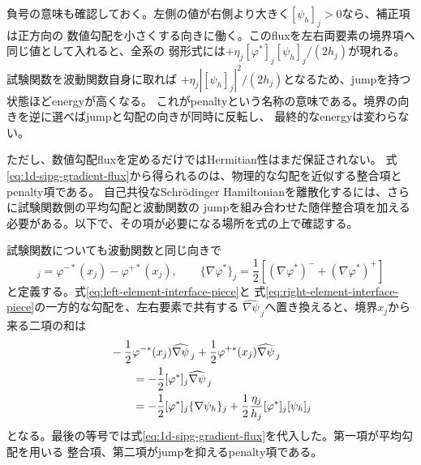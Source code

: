 \documentclass[11pt,a4paper]{article}
\begin{document}
負号の意味も確認しておく。左側の値が右側より大きく$[\psi_h]_j>0$なら、補正項は正方向の
数値勾配を小さくする向きに働く。このfluxを左右両要素の境界項へ同じ値として入れると、全系の
弱形式には$+\eta_j[\varphi^*]_j[\psi_h]_j/(2h_j)$が現れる。試験関数を波動関数自身に取れば
$+\eta_j|[\psi_h]_j|^2/(2h_j)$となるため、jumpを持つ状態ほどenergyが高くなる。
これがpenaltyという名称の意味である。境界の向きを逆に選べばjumpと勾配の向きが同時に反転し、
最終的なenergyは変わらない。

ただし、数値勾配fluxを定めるだけではHermitian性はまだ保証されない。
式\eqref{eq:1d-sipg-gradient-flux}から得られるのは、物理的な勾配を近似する整合項とpenalty項である。
自己共役なSchr\"odinger Hamiltonianを離散化するには、さらに試験関数側の平均勾配と波動関数の
jumpを組み合わせた随伴整合項を加える必要がある。以下で、その項が必要になる場所を式の上で確認する。

試験関数についても波動関数と同じ向きで
\begin{equation}
 [\varphi^*]_j=\varphi^{-*}(x_j)-\varphi^{+*}(x_j),
 \qquad
 \{\nabla\varphi^*\}_j
 =\frac12\left[(\nabla\varphi^*)^-+(\nabla\varphi^*)^+\right]
 \label{eq:1d-test-average-jump}
\end{equation}
と定義する。式\eqref{eq:left-element-interface-piece}と
式\eqref{eq:right-element-interface-piece}の一方的な勾配を、左右要素で共有する
$\widehat{\nabla\psi}_{\,j}$へ置き換えると、境界$x_j$から来る二項の和は
\begin{align}
 &-\frac12\varphi^{-*}(x_j)\widehat{\nabla\psi}_{\,j}
 +\frac12\varphi^{+*}(x_j)\widehat{\nabla\psi}_{\,j} \notag\\
 &\qquad=-\frac12[\varphi^*]_j\widehat{\nabla\psi}_{\,j} \notag\\
 &\qquad=-\frac12[\varphi^*]_j\{\nabla\psi_h\}_j
 +\frac12\frac{\eta_j}{h_j}[\varphi^*]_j[\psi_h]_j
 \label{eq:1d-flux-substitution}
\end{align}
となる。最後の等号では式\eqref{eq:1d-sipg-gradient-flux}を代入した。第一項が平均勾配を用いる
整合項、第二項がjumpを抑えるpenalty項である。
\end{document}
